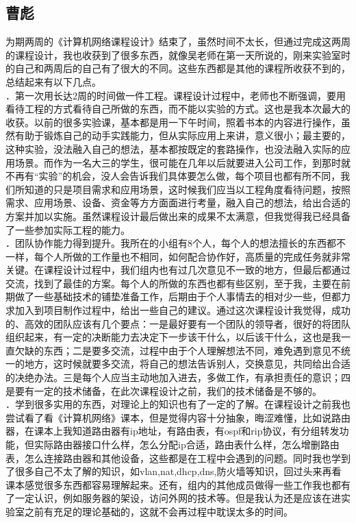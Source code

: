 	\subsection*{曹彪}
\indent 为期两周的《计算机网络课程设计》结束了，虽然时间不太长，但通过完成这两周的课程设计，我也收获到了很多东西，就像吴老师在第一天所说的，刚来实验室时的自己和两周后的自己有了很大的不同。这些东西都是其他的课程所收获不到的，总结起来有以下几点。\\
．第一次用长达2周的时间做一件工程。课程设计过程中，老师也不断强调，要用看待工程的方式看待自己所做的东西，而不能以实验的方式。这也是我本次最大的收获。以前的很多实验课，基本都是用一下午时间，照着书本的内容进行操作，虽然有助于锻炼自己的动手实践能力，但从实际应用上来讲，意义很小；最主要的，这种实验，没法融入自己的想法，基本都按既定的套路操作，也没法融入实际的应用场景。而作为一名大三的学生，很可能在几年以后就要进入公司工作，到那时就不再有“实验”的机会，没人会告诉我们具体要怎么做，每个项目也都有所不同，我们所知道的只是项目需求和应用场景，这时候我们应当以工程角度看待问题，按照需求、应用场景、设备、资金等方方面面进行考量，融入自己的想法，给出合适的方案并加以实施。虽然课程设计最后做出来的成果不太满意，但我觉得我已经具备了一些参加实际工程的能力。\\
．团队协作能力得到提升。我所在的小组有8个人，每个人的想法擅长的东西都不一样，每个人所做的工作量也不相同，如何配合协作好，高质量的完成任务就非常关键。在课程设计过程中，我们组内也有过几次意见不一致的地方，但最后都通过交流，找到了最佳的方案。每个人的所做的东西也都有些区别，至于我，主要在前期做了一些基础技术的铺垫准备工作，后期由于个人事情去的相对少一些，但都力求加入到项目制作过程中，给出一些自己的建议。通过这次课程设计我觉得，成功的、高效的团队应该有几个要点：一是最好要有一个团队的领导者，很好的将团队组织起来，有一定的决断能力去决定下一步该干什么，以后该干什么，这也是我一直欠缺的东西；二是要多交流，过程中由于个人理解想法不同，难免遇到意见不统一的地方，这时候就要多交流，将自己的想法告诉别人，交换意见，共同给出合适的决绝办法。三是每个人应当主动地加入进去，多做工作，有承担责任的意识；四是要有一定的技术储备，在此次课程设计之前，我们的技术储备是不够的。\\
．学到很多实用的东西，对理论上的知识也有了一定的了解。在课程设计之前我也尝试看了看《计算机网络》课本，但是觉得内容十分抽象，晦涩难懂，比如说路由器，在课本上我知道路由器有ip地址，有路由表，有ospf和rip协议，有分组转发功能，但实际路由器接口什么样，怎么分配ip合适，路由表什么样，怎么增删路由表，怎么连接路由器和其他设备，这些都是在工程中会遇到的问题。同时我也学到了很多自己不太了解的知识，如vlan,nat,dhcp,dns,防火墙等知识，回过头来再看课本感觉很多东西都容易理解起来。还有，组内的其他成员做得一些工作我也都有了一定认识，例如服务器的架设，访问外网的技术等。但是我认为还是应该在进实验室之前有充足的理论基础的，这就不会再过程中耽误太多的时间。\\
